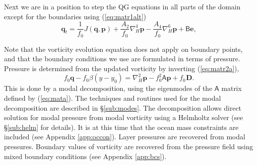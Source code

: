 \documentclass[11pt, a4paper,twoside]{article}
\newcommand{\at}[1]{{{}^{#1}A_2}}
\newcommand{\ah}[1]{{{}^{#1}A_4}}
\newcommand{\vc}[1]{\mathbf{#1}}
\newcommand{\mtx}[1]{\vc{\mathsf{#1}}}
\newcommand{\Dt}[1]{\vc{{}^{#1}\vc{D}}}
\numberwithin{equation}{section}
\begin{document}
Next we are in a position to step the QG equations in all parts of the domain except for the boundaries using (\ref{eq:matr1alt})
\begin{equation}\label{eq:matr1b}
\vc{q}_t  = \frac{1}{f_0}J(\vc{q},\vc{p}) + \frac{\at{}}{f_0}\nabla_H^4 \vc{p} - \frac{\ah{}}{f_0}\nabla_H^6 \vc{p} + \mtx{B}\vc{e} ,
\end{equation}

Note that the vorticity evolution equation does not apply on boundary points, and that the boundary conditions we use are formulated in terms of pressure.
Pressure is determined from the updated vorticity by inverting (\ref{eq:matr2a}),
\begin{equation}\label{eq:matr2b}
f_0 \vc{q} - f_0 \beta(y-y_0) =  \nabla_H^2 \vc{p}  - f_0^2 \mtx{A}\vc{p} + f_0\Dt{}.
\end{equation}
This is done by a modal decomposition, using the eigenmodes of the $\mtx{A}$ matrix defined by (\ref{eq:mata}). 
The techniques and routines used for the modal decomposition are described in \S\ref{sub:modes}.
The decomposition allows direct solution for modal pressure from modal vorticity using a Helmholtz solver (see \S\ref{sub:helm} for details).
It is at this time that the ocean mass constraints are included (see Appendix \ref{app:occon}).
Layer pressures are recovered from modal pressures.
Boundary values of vorticity are recovered from the pressure field using mixed boundary conditions (see Appendix \ref{app:bcs}).
\end{document}
